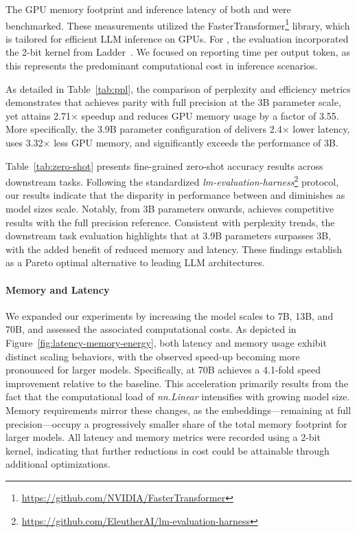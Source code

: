 The GPU memory footprint and inference latency of both  and  were benchmarked. These measurements utilized the FasterTransformer\footnote{\url{https://github.com/NVIDIA/FasterTransformer}} library, which is tailored for efficient LLM inference on GPUs. For , the evaluation incorporated the 2-bit kernel from Ladder~\cite{ladder}. We focused on reporting time per output token, as this represents the predominant computational cost in inference scenarios.

As detailed in Table~\ref{tab:ppl}, the comparison of perplexity and efficiency metrics demonstrates that  achieves parity with full precision  at the 3B parameter scale, yet attains 2.71$\times$ speedup and reduces GPU memory usage by a factor of 3.55. More specifically, the 3.9B parameter configuration of  delivers 2.4$\times$ lower latency, uses 3.32$\times$ less GPU memory, and significantly exceeds the performance of  3B.

Table~\ref{tab:zero-shot} presents fine-grained zero-shot accuracy results across downstream tasks. Following the standardized \emph{lm-evaluation-harness}\footnote{\url{https://github.com/EleutherAI/lm-evaluation-harness}} protocol, our results indicate that the disparity in performance between  and  diminishes as model sizes scale. Notably, from 3B parameters onwards,  achieves competitive results with the full precision reference. Consistent with perplexity trends, the downstream task evaluation highlights that  at 3.9B parameters surpasses  3B, with the added benefit of reduced memory and latency. These findings establish  as a Pareto optimal alternative to leading LLM architectures.

\paragraph{Memory and Latency}

We expanded our experiments by increasing the model scales to 7B, 13B, and 70B, and assessed the associated computational costs. As depicted in Figure~\ref{fig:latency-memory-energy}, both latency and memory usage exhibit distinct scaling behaviors, with the observed speed-up becoming more pronounced for larger models. Specifically,  at 70B achieves a 4.1-fold speed improvement relative to the  baseline. This acceleration primarily results from the fact that the computational load of \emph{nn.Linear} intensifies with growing model size. Memory requirements mirror these changes, as the embeddings—remaining at full precision—occupy a progressively smaller share of the total memory footprint for larger models. All latency and memory metrics were recorded using a 2-bit kernel, indicating that further reductions in cost could be attainable through additional optimizations.

